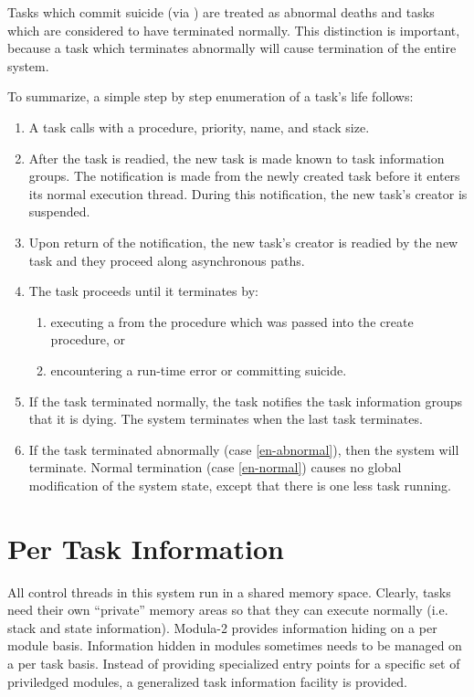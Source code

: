 Tasks which commit suicide (via ) 
are treated as abnormal deaths and tasks which  are 
considered to have terminated normally.  
This distinction is important, because a task which terminates
abnormally will cause termination of the entire system.

To summarize, a simple step by step enumeration of a task's life follows:
\begin{enumerate}
\item
    A task calls  with a procedure, priority, name, and stack size.
\item
    After the task is readied, the new task is made known to task information
    groups.  The notification is made from the newly created task before
    it enters its normal execution thread.  During this notification, the
    new task's creator is suspended.
\item
    Upon return of the notification, the new task's creator is readied
    by the new task and they proceed along asynchronous paths.
\item
    The task proceeds until it terminates by:
    \begin{enumerate}
    \item \label{en-normal}
	executing a  from the procedure which was passed into
	the create procedure, or
    \item \label{en-abnormal}
	encountering a run-time error or committing suicide.
    \end{enumerate}
\item
    If the task terminated normally, the task notifies the task
    information groups that it is dying.  The system terminates when 
    the last task terminates.
\item
    If the task terminated abnormally (case \ref{en-abnormal}),
    then the system will terminate.  Normal termination (case \ref{en-normal})
    causes no global modification of the system state, except that there is
    one less task running.
\end{enumerate}

\section{Per Task Information}
All control threads in this system run in a shared memory space.
Clearly, tasks need their own ``private'' memory areas so that they
can execute normally (i.e. stack and state information).
Modula-2 provides information hiding on a per module basis.
Information hidden in modules sometimes needs to be managed on a 
per task basis.
Instead of providing specialized entry points for a specific set
of priviledged modules, a generalized task information facility is
provided.  

